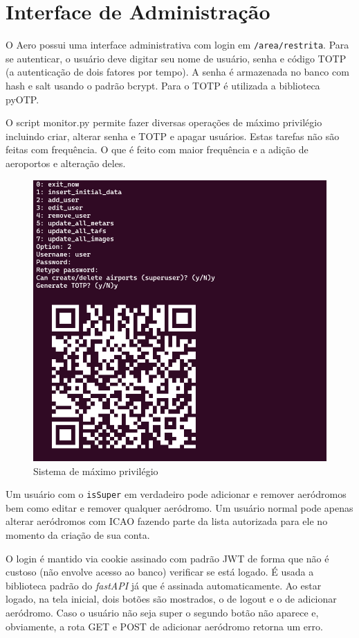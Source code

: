 \chapter{Interface de Administração}

O Aero possui uma interface administrativa com login em \verb|/area/restrita|. 
Para se autenticar,
o usuário deve digitar seu nome de usuário, senha e código TOTP (a autenticação
de dois fatores por tempo). A senha é armazenada no banco com hash e salt usando 
o padrão bcrypt. Para o TOTP é utilizada a biblioteca pyOTP. 

O script monitor.py permite fazer diversas operações de máximo privilégio 
incluindo criar, alterar senha e TOTP e apagar usuários. Estas tarefas não são 
feitas com frequência. O que é feito com maior frequência e a adição de aeroportos 
e alteração deles.

\begin{figure}[ht]
    \begin{center}
    \includegraphics[width=0.8\linewidth]{img/create-user-script.png}
    \caption{Sistema de máximo privilégio}
    \label{fig:max-priv-sys}
    \end{center}
\end{figure}

Um usuário com o \verb|isSuper| em verdadeiro pode adicionar e remover aeródromos 
bem como editar e remover qualquer aeródromo. Um usuário normal pode apenas alterar 
aeródromos com ICAO fazendo parte da lista autorizada para ele no momento da criação
de sua conta.

O login é mantido via cookie assinado com padrão JWT de forma que não é custoso 
(não envolve acesso ao banco) verificar se está logado. É usada a biblioteca padrão 
do \textit{fastAPI} já que é assinada automaticamente.
Ao estar logado, na tela inicial, dois botões são mostrados, o de logout e o de adicionar 
aeródromo. Caso o usuário não seja super o segundo botão não aparece e, obviamente, 
a rota GET e POST de adicionar aeródromo retorna um erro.


